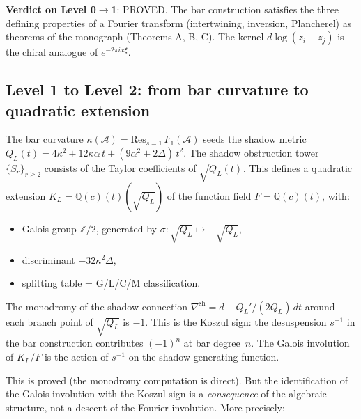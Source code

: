 \documentclass[11pt]{article}
\newcommand{\cA}{\mathcal{A}}
\newcommand{\Z}{\mathbb{Z}}
\newcommand{\Q}{\mathbb{Q}}
\begin{document}
\textbf{Verdict on Level 0$\to$1}: PROVED.  The bar construction
satisfies the three defining properties of a Fourier transform
(intertwining, inversion, Plancherel) as theorems of the monograph
(Theorems A, B, C).  The kernel $d\log(z_i - z_j)$ is the
chiral analogue of $e^{-2\pi i x\xi}$.

\subsection{Level 1 to Level 2: from bar curvature to quadratic extension}

The bar curvature $\kappa(\cA) = \text{Res}_{s=1}\, F_1(\cA)$
seeds the shadow metric $Q_L(t) = 4\kappa^2 + 12\kappa\alpha\,t
+ (9\alpha^2 + 2\Delta)\,t^2$.  The shadow obstruction tower
$\{S_r\}_{r \geq 2}$ consists of the Taylor coefficients of
$\sqrt{Q_L(t)}$.  This defines a quadratic extension
$K_L = \Q(c)(t)(\sqrt{Q_L})$ of the function field $F = \Q(c)(t)$,
with:
\begin{itemize}[nosep]
\item Galois group $\Z/2$, generated by
  $\sigma\colon \sqrt{Q_L} \mapsto -\sqrt{Q_L}$,
\item discriminant $-32\kappa^2\Delta$,
\item splitting table = G/L/C/M classification.
\end{itemize}

\begin{proposition}
\label{prop:galois-koszul-sign}
The monodromy of the shadow connection
$\nabla^{\mathrm{sh}} = d - Q_L'/(2Q_L)\,dt$ around each branch
point of $\sqrt{Q_L}$ is $-1$.  This is the Koszul sign: the
desuspension $s^{-1}$ in the bar construction contributes $(-1)^n$
at bar degree~$n$.  The Galois involution of $K_L/F$ is the action
of $s^{-1}$ on the shadow generating function.
\end{proposition}

This is proved (the monodromy computation is direct).
But the identification of the Galois involution with the Koszul
sign is a \emph{consequence} of the algebraic structure, not
a descent of the Fourier involution.  More precisely:
\end{document}
